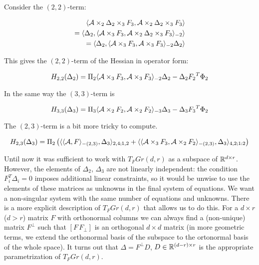 Consider the $(2,2)$-term:

\begin{eqnarray*}
\langle \mathcal{A} \times_2 \Delta{_2} \times_3 {F_3}, \mathcal{A} \times_2 \Delta{_2} \times_3 {F_3} \rangle \\
= \langle \Delta{_2}, \langle \mathcal{A} \times_3 {F_3}, \mathcal{A} \times_2 \Delta{_2} \times_3 {F_3} \rangle_{-2} \rangle \\
 = \langle \Delta{_2}, \langle \mathcal{A} \times_3 {F_3}, \mathcal{A}  \times_3 {F_3} \rangle_{-2} \Delta{_2} \rangle
\end{eqnarray*}

This gives the $(2,2)$-term of the Hessian in operator form:

\begin{equation}
H_{2,2}(\Delta{_2}) = \Pi{_2} \langle \mathcal{A} \times_3 {F_3}, \mathcal{A} \times_3 {F_3} \rangle_{-2} \Delta{_2} - \Delta{_2} {F_2}^T \Phi{_2}
\end{equation}

In the same way the $(3,3)$-term is

\begin{equation}
{H}_{3,3}(\Delta{_3}) = \Pi{_3} \langle \mathcal{A} \times_2 {F_2}, \mathcal{A} \times_2 {F_2} \rangle_{-3} \Delta{_3} - \Delta{_3} {F_3}^T \Phi{_2}
\end{equation}

The $(2,3)$-term is a bit more tricky to compute.

\begin{equation}
H_{2,3}(\Delta{_3}) = \Pi{_2} \left( \langle  \langle \mathcal{A}, F \rangle_{-(2,3)}, \Delta{_3} \rangle_{2,4;1,2}    
+ \langle \langle \mathcal{A} \times_3 {F_3}, \mathcal{A} \times_2 {F_2} \rangle_{-(2,3)}, \Delta{_3} \rangle_{4,2;1:2} \right)
\end{equation}

Until now it was sufficient to work with $T_F Gr(d,r)$ as a subspace of  $\mathbb{R}^{d \times r}$.
However, the elements of $\Delta_2$, $\Delta_3$ are not linearly independent:
the condition $F_i^T \Delta_i = 0$ imposes additional linear constraints,
so it would be unwise to use the elements of these matrices as unknowns
in the final system of equations. We want a non-singular system
with the same number of equations and unknowns. There is a more explicit description
of $T_F Gr(d, r)$ that allows us to do this.  For a $d \times r$ ($d > r$) matrix
$F$ with orthonormal columns we can always find a (non-unique) matrix $F^{\bot}$ such that $[ F \, F_{\bot} ]$
is an orthogonal $d \times d$ matrix (in more geometric terms, we extend the orthonormal
basis of the subspace to the ortonormal basis of the whole space). It turns out that
$\Delta = F^{\bot} D$, $D \in \mathbb{R}^{(d-r) \times r}$ is the appropriate parametrization
of $T_F Gr(d, r)$.

